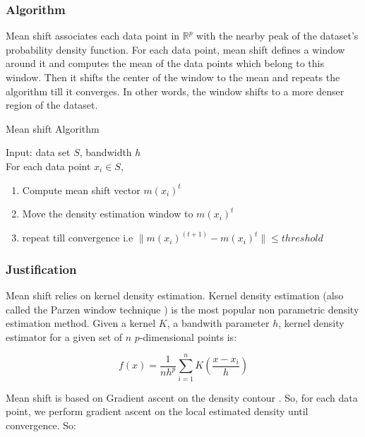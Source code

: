 \documentclass{llncs}
\begin{document}
\subsubsection{Algorithm}
Mean shift associates each data point in $\mathbb{R}^p$ with the
nearby peak of the dataset's probability density function. For each data
point, mean shift defines a window around it and computes the mean of the data
points which belong to this window. Then it shifts the center of the window to
the mean and repeats the algorithm till it converges. In other words, the
window shifts to a more denser region of the dataset.

\vspace{-0.5cm}

\begin{algorithm}
\caption{Mean shift Algorithm}
Input: data set $S$, bandwidth $h$\\
 For each data point $x_i\in S$, 
 \begin{enumerate}
   \item Compute mean shift vector $m(x_i)^t$ 
   \item Move the density estimation window to $m(x_i)^t$
   \item repeat till convergence i.e $\|m(x_i)^{(t+1)}-m(x_i)^t\|\leq threshold$
 \end{enumerate}
\end{algorithm}

\vspace{-1.0cm}

\subsubsection{Justification}

Mean shift relies on kernel density estimation.  Kernel density estimation
\cite{Rosenblatt} (also called the Parzen window technique \cite{Parzen}) is
the most popular non parametric density estimation method. Given a kernel $K$,
a bandwith parameter $h$, kernel density estimator for a given set of $n$
$p$-dimensional points is:

\begin{equation}
  f(x)=\frac{1}{nh^p}\sum_{i=1}^n K\left(\frac{x-x_i}{h}\right)
\end{equation}

Mean shift is based on Gradient ascent on the density contour \cite{Comaniciu1999}. So, for each
data point, we perform gradient ascent on the local estimated density until
convergence. So:
\end{document}
